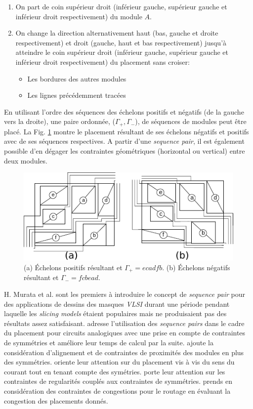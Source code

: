 \begin{enumerate}
\item On part de coin supérieur droit (inférieur gauche, supérieur gauche et inférieur droit respectivement) du module $A$.
\item On change la direction alternativement haut (bas, gauche et droite respectivement) et droit (gauche, haut et bas respectivement) jusqu'à atteindre le coin supérieur droit (inférieur gauche, supérieur gauche et inférieur droit respectivement) du placement sans croiser:
\begin{itemize}
\item Les bordures des autres modules
\item Les lignes précédemment tracées
\end{itemize}
\end{enumerate}
En utilisant l'ordre des séquences des échelons positifs et négatifs (de la gauche vers la droite), une paire ordonnée, ($\Gamma_+, \Gamma_-$), de séquences de modules peut être placé. La Fig. \ref{fig:3} montre le placement résultant de ses échelons négatifs et positifs avec de ses séquences respectives. A partir d'une {\it sequence pair}, il est également possible d'en dégager les contraintes géométriques (horizontal ou vertical) entre deux modules.

\begin{figure}[h]
\begin{center}
\includegraphics[height=0.22\textheight]{Figures/3.pdf}
\caption{(a) \'Echelons positifs résultant et $\Gamma_+=ecadfb$. (b) \'Echelons négatifs résultant et $\Gamma_-=fcbead$.} 
\label{fig:3}
\end{center}
\end{figure}

H. Murata et al. \cite{Murata1996} sont les premiers à introduire le concept de {\it sequence pair} pour des applications de dessins des masques {\it VLSI} durant une période pendant laquelle les {\it slicing models} étaient populaires mais ne produisaient pas des résultats assez satisfaisant. \cite{Balasa2000} adresse l'utilisation des {\it sequence pairs} dans le cadre du placement pour circuits analogiques avec une prise en compte de contraintes de symmétries et \cite{Balasa2001} améliore leur temps de calcul par la suite. \cite{Cheong2006} ajoute la considération d'alignement et de contraintes de proximités des modules en plus des symmétries. \cite{Long2006} oriente leur attention sur du placement vis à vis du sens du courant tout en tenant compte des symétries. \cite{Nakatake2010} porte leur attention sur les contraintes de regularités couplés aux contraintes de symmétries. \cite{Xiao10} prends en considération des contraintes de congestions pour le routage en évaluant la congestion des placements donnés. 

